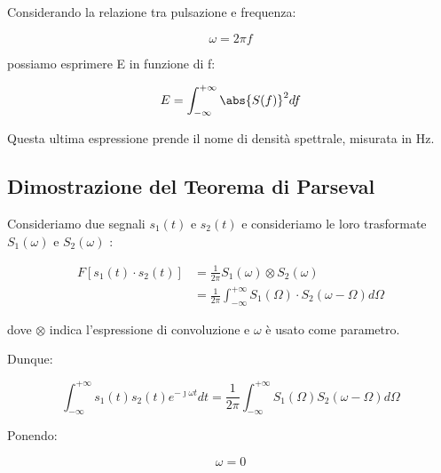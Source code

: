 Considerando la relazione tra pulsazione e frequenza: 

{
    \Large 
    \begin{equation}
        \omega = 2 \pi f
    \end{equation}
}

possiamo esprimere E in funzione di f: 

{
    \Large 
    \begin{equation}
        E = \int_{- \infty}^{+ \infty} 
        \abs{S(f)} ^{2} df
    \end{equation}
}

Questa ultima espressione prende il nome di densità spettrale, misurata in Hz. \newline 

\newpage 

\subsection{Dimostrazione del Teorema di Parseval} 

Consideriamo due segnali $s_1 (t)$ e $s_2 (t)$ e consideriamo le loro trasformate 
$S_1 (\omega)$ e $S_2 (\omega)$ : 

{
    \Large 
    \begin{equation}
        \begin{split}
            F[s_1(t) \cdot s_2(t)]
            &=
            \frac{1}{2 \pi} 
            S_1 (\omega) \otimes S_2 (\omega) 
            \\ 
            &= 
            \frac{1}{2 \pi}
            \int_{-\infty}^{+ \infty}
            S_1 (\Omega) \cdot S_2 (\omega - \Omega)  
            d\Omega
        \end{split}
    \end{equation}
}

dove $\otimes$ indica l'espressione di convoluzione e $\omega$ è usato come parametro. \newline 

Dunque: 

{
    \Large 
    \begin{equation}
        \int_{- \infty}^{+ \infty} 
        s_1 (t) s_2 (t) e^{-\jmath \omega t} dt 
        = 
        \frac{1}{2 \pi} 
        \int_{- \infty}^{+ \infty}
        S_1 (\Omega) S_2 (\omega - \Omega) d\Omega
    \end{equation}
}

Ponendo: 

{
    \Large 
    \begin{equation}
        \omega = 0
    \end{equation}
}

